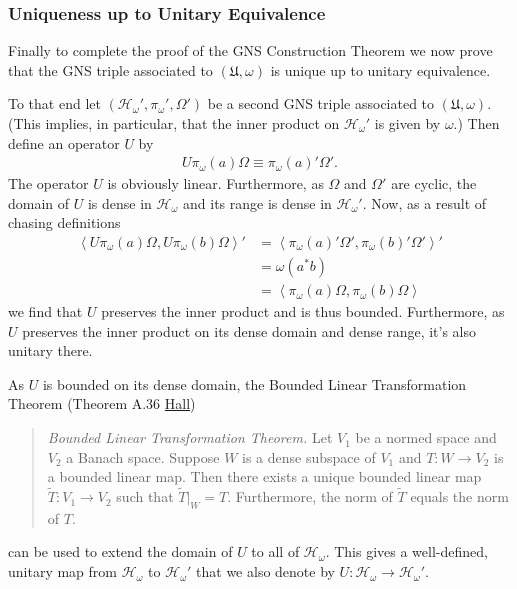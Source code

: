 \subsubsection{Uniqueness up to Unitary Equivalence}
Finally to complete the proof of the GNS Construction Theorem we now prove that the GNS triple associated to $(\mathfrak{U}, \omega)$ is unique up to unitary equivalence.

To that end let $(\mathcal{H}_\omega', \pi_\omega', \Omega')$ be a second GNS triple associated to $(\mathfrak{U}, \omega)$. (This implies, in particular, that the inner product on $\mathcal{H}_\omega'$ is given by $\omega$.) Then define an operator $U$ by
\begin{align}
    U\pi_\omega(a)\Omega \equiv \pi_\omega(a)'\Omega'.
\end{align}
The operator $U$ is obviously linear. Furthermore, as $\Omega$ and $\Omega'$ are cyclic, the domain of $U$ is dense in $\mathcal{H}_\omega$ and its range is dense in $\mathcal{H}_\omega'$. Now, as a result of chasing definitions
\begin{align}
    \left< U\pi_\omega(a)\Omega, U\pi_\omega(b)\Omega \right>' &= \left<\pi_\omega(a)'\Omega', \pi_\omega(b)'\Omega'\right>' \\
                                                               &= \omega(a^*b) \\
                                                               &= \left<\pi_\omega(a)\Omega, \pi_\omega(b)\Omega\right>
\end{align}
we find that $U$ preserves the inner product and is thus bounded. Furthermore, as $U$ preserves the inner product on its dense domain and dense range, it's also unitary there.

As $U$ is bounded on its dense domain, the Bounded Linear Transformation Theorem (Theorem A.36 \href{https://doi.org/10.1007/978-1-4614-7116-5}{Hall})

\begin{quote}
    \textit{Bounded Linear Transformation Theorem.} Let $V_1$ be a normed space and $V_2$ a Banach space. Suppose $W$ is a dense subspace of $V_1$ and $T: W \rightarrow V_2$ is a bounded linear map. Then there exists a unique bounded linear map $\widetilde{T}: V_1 \rightarrow V_2$ such that $\widetilde{T}|_W = T$. Furthermore, the norm of $\widetilde{T}$ equals the norm of $T$.
\end{quote}

\noindent can be used to extend the domain of $U$ to all of $\mathcal{H}_\omega$. This gives a well-defined, unitary map from $\mathcal{H}_\omega$ to $\mathcal{H}_\omega'$ that we also denote by $U : \mathcal{H}_\omega \rightarrow \mathcal{H}_\omega'$.

